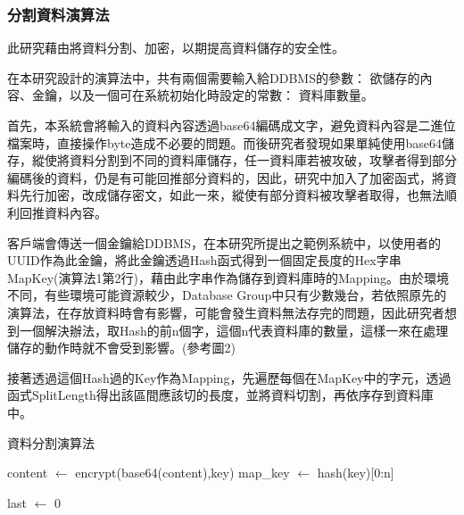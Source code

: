 \documentclass[11pt,twocolumn]{article}
\begin{document}
\subsubsection{分割資料演算法}
此研究藉由將資料分割、加密，以期提高資料儲存的安全性。\par
在本研究設計的演算法中，共有兩個需要輸入給DDBMS的參數： 欲儲存的內容、金鑰，以及一個可在系統初始化時設定的常數： 資料庫數量。\par
首先，本系統會將輸入的資料內容透過base64編碼成文字，避免資料內容是二進位檔案時，直接操作byte造成不必要的問題。而後研究者發現如果單純使用base64儲存，縱使將資料分割到不同的資料庫儲存，任一資料庫若被攻破，攻擊者得到部分編碼後的資料，仍是有可能回推部分資料的，因此，研究中加入了加密函式，將資料先行加密，改成儲存密文，如此一來，縱使有部分資料被攻擊者取得，也無法順利回推資料內容。\par
客戶端會傳送一個金鑰給DDBMS，在本研究所提出之範例系統中，以使用者的UUID作為此金鑰，將此金鑰透過Hash函式得到一個固定長度的Hex字串MapKey(演算法1第2行)，藉由此字串作為儲存到資料庫時的Mapping。由於環境不同，有些環境可能資源較少，Database Group中只有少數幾台，若依照原先的演算法，在存放資料時會有影響，可能會發生資料無法存完的問題，因此研究者想到一個解決辦法，取Hash的前n個字，這個n代表資料庫的數量，這樣一來在處理儲存的動作時就不會受到影響。(參考圖2)\par
接著透過這個Hash過的Key作為Mapping，先遍歷每個在MapKey中的字元，透過函式SplitLength得出該區間應該切的長度，並將資料切割，再依序存到資料庫中。\par
\begin{algorithm}
	\caption{
	    資料分割演算法
	}\label{algo:b}
		
		
	
	content $\gets$ encrypt(base64(content),key) \;
	map\_key $\gets$ hash(key)[0:n] \;
		
	last $\gets$ 0\;
		
\end{algorithm}
\end{document}
